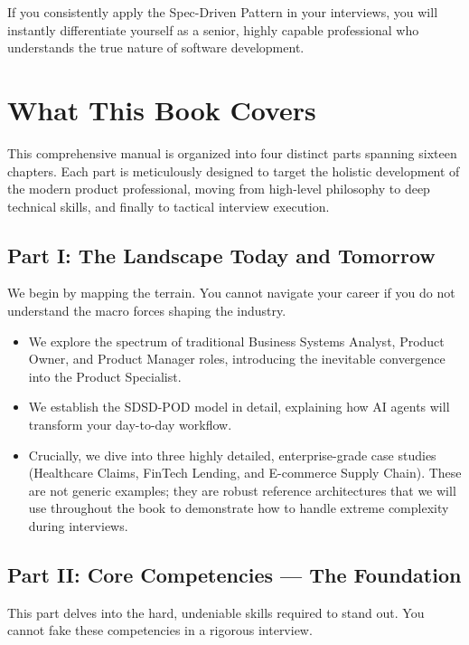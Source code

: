 If you consistently apply the Spec-Driven Pattern in your interviews,
you will instantly differentiate yourself as a senior, highly capable
professional who understands the true nature of software development.

\section{What This Book Covers}\label{what-this-book-covers}

This comprehensive manual is organized into four distinct parts spanning
sixteen chapters. Each part is meticulously designed to target the
holistic development of the modern product professional, moving from
high-level philosophy to deep technical skills, and finally to tactical
interview execution.

\subsection{Part I: The Landscape Today and
Tomorrow}\label{part-i-the-landscape-today-and-tomorrow}

We begin by mapping the terrain. You cannot navigate your career if you
do not understand the macro forces shaping the industry.

\begin{itemize}
\tightlist
\item
  We explore the spectrum of traditional Business Systems Analyst,
  Product Owner, and Product Manager roles, introducing the inevitable
  convergence into the Product Specialist.
\item
  We establish the SDSD-POD model in detail, explaining how AI agents
  will transform your day-to-day workflow.
\item
  Crucially, we dive into three highly detailed, enterprise-grade case
  studies (Healthcare Claims, FinTech Lending, and E-commerce Supply
  Chain). These are not generic examples; they are robust reference
  architectures that we will use throughout the book to demonstrate how
  to handle extreme complexity during interviews.
\end{itemize}

\subsection{Part II: Core Competencies --- The
Foundation}\label{part-ii-core-competencies-the-foundation}

This part delves into the hard, undeniable skills required to stand out.
You cannot fake these competencies in a rigorous interview.

